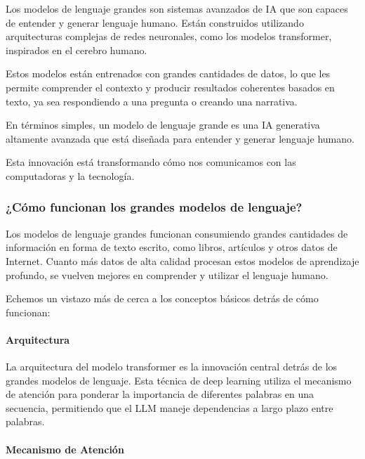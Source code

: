 \documentclass[a4paper12pt]{article}
\begin{document}
Los modelos de lenguaje grandes son sistemas avanzados de IA que son
capaces de entender y generar lenguaje humano. Están construidos
utilizando arquitecturas complejas de redes neuronales, como los modelos
transformer, inspirados en el cerebro humano.

Estos modelos están entrenados con grandes cantidades de datos, lo que
les permite comprender el contexto y producir resultados coherentes
basados en texto, ya sea respondiendo a una pregunta o creando una
narrativa.

En términos simples, un modelo de lenguaje grande es una IA generativa
altamente avanzada que está diseñada para entender y generar lenguaje
humano.

Esta innovación está transformando cómo nos comunicamos con las
computadoras y la tecnología.

    \hypertarget{cuxf3mo-funcionan-los-grandes-modelos-de-lenguaje}{%
\subsubsection{¿Cómo funcionan los grandes modelos de
lenguaje?}\label{cuxf3mo-funcionan-los-grandes-modelos-de-lenguaje}}

Los modelos de lenguaje grandes funcionan consumiendo grandes cantidades
de información en forma de texto escrito, como libros, artículos y otros
datos de Internet. Cuanto más datos de alta calidad procesan estos
modelos de aprendizaje profundo, se vuelven mejores en comprender y
utilizar el lenguaje humano.

Echemos un vistazo más de cerca a los conceptos básicos detrás de cómo
funcionan:

\hypertarget{arquitectura}{%
\paragraph{Arquitectura}\label{arquitectura}}

La arquitectura del modelo transformer es la innovación central detrás
de los grandes modelos de lenguaje. Esta técnica de deep learning
utiliza el mecanismo de atención para ponderar la importancia de
diferentes palabras en una secuencia, permitiendo que el LLM maneje
dependencias a largo plazo entre palabras.

\hypertarget{mecanismo-de-atenciuxf3n}{%
\paragraph{Mecanismo de Atención}\label{mecanismo-de-atenciuxf3n}}
\end{document}
